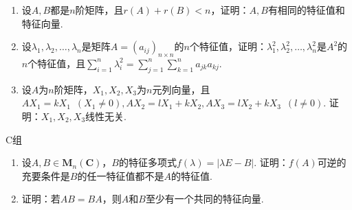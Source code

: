 \begin{enumerate}
    \item 设$A,B$都是$n$阶矩阵，且$r(A)+r(B)<n$，证明：$A,B$有相同的特征值和特征向量.

    \item 设$\lambda_1,\lambda_2,\ldots,\lambda_n$是矩阵$A=(a_{ij})_{n\times n}$的$n$个特征值，证明：$\lambda_1^2,\lambda_2^2,\ldots,\lambda_n^2$是$A^2$的$n$个特征值，且$\displaystyle\sum_{i=1}^{n}\lambda_i^2=\displaystyle\sum_{j=1}^{n}\displaystyle\sum_{k=1}^{n}a_{jk}a_{kj}$.

    \item 设$A$为$n$阶矩阵，$X_1,X_2,X_3$为$n$元列向量，且$AX_1=kX_1\enspace(X_1\neq 0),AX_2=lX_1+kX_2,AX_3=lX_2+kX_3\enspace(l\neq 0)$. 证明：$X_1,X_2,X_3$线性无关.
\end{enumerate}

\centerline{\heiti C组}
\begin{enumerate}
    \item 设$A,B\in \mathbf{M}_n(\mathbf{C})$，$B$的特征多项式$f(\lambda)=|\lambda E-B|$. 证明：$f(A)$可逆的充要条件是$B$的任一特征值都不是$A$的特征值.

    \item 证明：若$AB=BA$，则$A$和$B$至少有一个共同的特征向量.
\end{enumerate}
